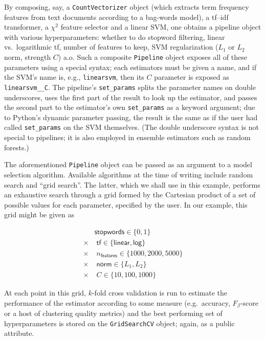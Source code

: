 \documentclass[a4paper]{article}
\begin{document}
By composing, say, a \texttt{CountVectorizer} object
(which extracts term frequency features from text documents
according to a bag-words model),
a \textsf{tf--idf} transformer, a $\chi^2$ feature selector and a linear SVM,
one obtains a pipeline object with various hyperparameters:
whether to do stopword filtering,
linear vs.\ logarithmic \textsf{tf}, number of features to keep,
SVM regularization ($L_1$ or $L_2$ norm, strength $C$) a.o.
Such a composite \texttt{Pipeline} object
exposes all of these parameters using a special syntax;
each estimators must be given a name,
and if the SVM's name is, e.g., \texttt{linearsvm},
then its $C$ parameter is exposed as \texttt{linearsvm\_\_C}.
The pipeline's \texttt{set\_params} splits the parameter names
on double underscores, uses the first part of the result
to look up the estimator,
and passes the second part to the estimator's own \texttt{set\_params}
as a keyword argument; due to Python's dynamic parameter passing,
the result is the same as if the user had called \texttt{set\_params}
on the SVM themselves.
(The double underscore syntax is not special to pipelines;
it is also employed in ensemble estimators such as random forests.)

The aforementioned \texttt{Pipeline} object
can be passed as an argument to a model selection algorithm.
Available algorithms at the time of writing include random search
\citep{bergstra2012} and ``grid search''.
The latter, which we shall use in this example,
performs an exhaustive search through a grid formed by the Cartesian product
of a set of possible values for each parameter, specified by the user.
In our example, this grid might be given as

\begin{align*}
         & \textsf{stopwords} \in \{0, 1\}                      \\
  \times & \; \textsf{tf} \in \{\textsf{linear}, \textsf{log}\} \\
  \times & \; n_\textsf{features} \in \{1000, 2000, 5000\}      \\
  \times & \; \textsf{norm} \in \{L_1, L_2\}                    \\
  \times & \; C \in \{10, 100, 1000\}
\end{align*}

At each point in this grid, $k$-fold cross validation is run
to estimate the performance of the estimator according to some measure
(e.g.\ accuracy, $F_\beta$-score or a host of clustering quality metrics)
and the best performing set of hyperparameters is stored
on the \texttt{GridSearchCV} object; again, as a public attribute.
\end{document}
